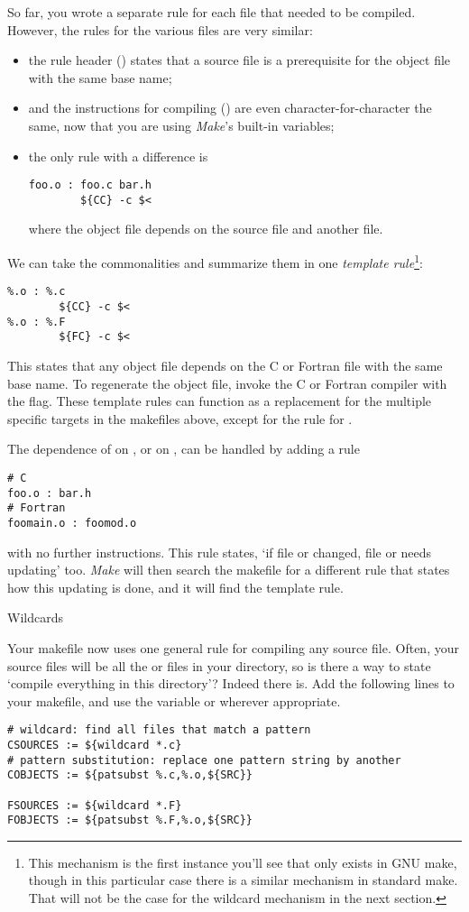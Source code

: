 So far, you wrote a separate rule for each file that
needed to be compiled. However, the rules for the various 
files are very similar:
\begin{itemize}
\item the rule header () states that a source file is a
  prerequisite for the object file with the same base name;
\item and the instructions for compiling () 
  are even character-for-character the
  same, now that you are using \emph{Make}'s built-in variables;
\item the only rule with a difference is 
\begin{verbatim}
foo.o : foo.c bar.h
        ${CC} -c $<
\end{verbatim}
  where the object file depends on the source file and another file.
\end{itemize}
We can take the commonalities and summarize them in one 
\emph{template rule}\footnote
{This mechanism is the first instance you'll see that only exists in
  GNU make, though in this particular case there is a similar
  mechanism in standard make. That will not be the case for the
  wildcard mechanism in the next section.}:
\begin{verbatim}
%.o : %.c
        ${CC} -c $<
%.o : %.F
        ${FC} -c $<
\end{verbatim}
This states that any object file depends on the C or Fortran file with
the same base name. To regenerate the object file, invoke the C or
Fortran compiler with the  flag.
These template rules can function as a replacement for the multiple
specific targets in the makefiles above, except for the rule for .

The dependence of  on , or  on
, can be handled by adding a rule
\begin{verbatim}
# C
foo.o : bar.h
# Fortran
foomain.o : foomod.o
\end{verbatim}
with no further instructions. This rule states, `if file
 or  changed, file  or 
needs updating' too. \emph{Make} will
then search the makefile for a different
rule that states how this updating is done, and it will find the
template rule.


 {Wildcards}

Your makefile now uses one general rule for compiling any source
file. Often, your source files will be all the  or 
files in your directory, so is there a way to state `compile
everything in this directory'? Indeed there is. Add the following lines
to your makefile, and use the variable  or 
wherever appropriate.
\begin{verbatim}
# wildcard: find all files that match a pattern
CSOURCES := ${wildcard *.c}
# pattern substitution: replace one pattern string by another
COBJECTS := ${patsubst %.c,%.o,${SRC}}

FSOURCES := ${wildcard *.F}
FOBJECTS := ${patsubst %.F,%.o,${SRC}}
\end{verbatim}

